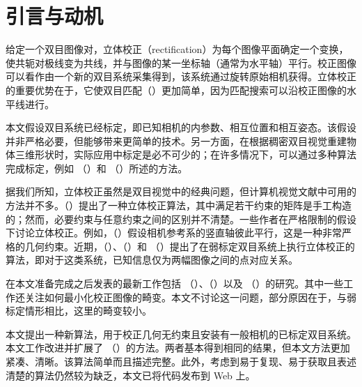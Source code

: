 \section{引言与动机}

给定一个双目图像对，立体校正（rectification）为每个图像平面确定一个变换，使共轭对极线变为共线，并与图像的某一坐标轴（通常为水平轴）平行。校正图像可以看作由一个新的双目系统采集得到，该系统通过旋转原始相机获得。立体校正的重要优势在于，它使双目匹配\citeauthor{dhond1989}（\citeyear{dhond1989}）更加简单，因为匹配搜索可以沿校正图像的水平线进行。

本文假设双目系统已经标定，即已知相机的内参数、相互位置和相互姿态。该假设并非严格必要，但能够带来更简单的技术。另一方面，在根据稠密双目视觉重建物体三维形状时，实际应用中标定是必不可少的；在许多情况下，可以通过多种算法完成标定，例如 \citeauthor{caprile1990}（\citeyear{caprile1990}）和 \citeauthor{robert1996}（\citeyear{robert1996}）所述的方法。

据我们所知，立体校正虽然是双目视觉中的经典问题，但计算机视觉文献中可用的方法并不多。\citeauthor{ayache1991}（\citeyear{ayache1991}）提出了一种立体校正算法，其中满足若干约束的矩阵是手工构造的；然而，必要约束与任意约束之间的区别并不清楚。一些作者在严格限制的假设下讨论立体校正。例如，\citeauthor{papadimitriou1996}（\citeyear{papadimitriou1996}）假设相机参考系的竖直轴彼此平行，这是一种非常严格的几何约束。近期，\citeauthor{hartley1993}（\citeyear{hartley1993}）、\citeauthor{robert1997}（\citeyear{robert1997}）和 \citeauthor{hartley1999}（\citeyear{hartley1999}）提出了在弱标定双目系统上执行立体校正的算法，即对于这类系统，已知信息仅为两幅图像之间的点对应关系。

在本文准备完成之后发表的最新工作包括 \citeauthor{loop1999}（\citeyear{loop1999}）、\citeauthor{isgro1999}（\citeyear{isgro1999}）以及 \citeauthor{pollefeys1999}（\citeyear{pollefeys1999}）的研究。其中一些工作还关注如何最小化校正图像的畸变。本文不讨论这一问题，部分原因在于，与弱标定情形相比，这里的畸变较小。

本文提出一种新算法，用于校正几何无约束且安装有一般相机的已标定双目系统。本文工作改进并扩展了 \citeauthor{ayache1991}（\citeyear{ayache1991}）的方法。两者基本得到相同的结果，但本文方法更加紧凑、清晰。该算法简单而且描述完整。此外，考虑到易于复现、易于获取且表述清楚的算法仍然较为缺乏，本文已将代码发布到 Web 上。
